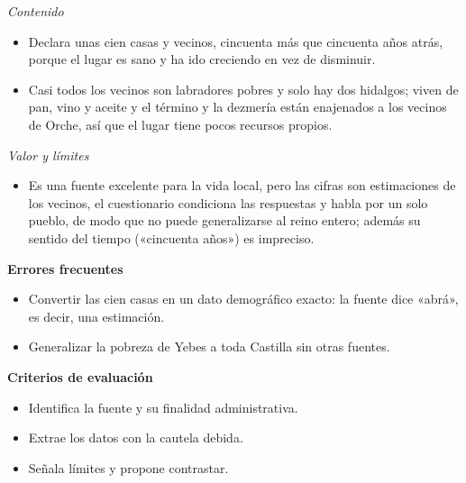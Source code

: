 \documentclass{book}
\begin{document}
\begin{tcolorbox}[title={Ejercicio resuelto}, studiumworked, breakable]
\noindent\textit{Contenido}
\begin{itemize}
\item Declara unas cien casas y vecinos, cincuenta más que cincuenta años atrás, porque el lugar es sano y ha ido creciendo en vez de disminuir.
\item Casi todos los vecinos son labradores pobres y solo hay dos hidalgos; viven de pan, vino y aceite y el término y la dezmería están enajenados a los vecinos de Orche, así que el lugar tiene pocos recursos propios.
\end{itemize}

\noindent\textit{Valor y límites}
\begin{itemize}
\item Es una fuente excelente para la vida local, pero las cifras son estimaciones de los vecinos, el cuestionario condiciona las respuestas y habla por un solo pueblo, de modo que no puede generalizarse al reino entero; además su sentido del tiempo («cincuenta años») es impreciso.
\end{itemize}

\noindent\textbf{Errores frecuentes}
\begin{itemize}
\item Convertir las cien casas en un dato demográfico exacto: la fuente dice «abrá», es decir, una estimación.
\item Generalizar la pobreza de Yebes a toda Castilla sin otras fuentes.
\end{itemize}

\noindent\textbf{Criterios de evaluación}
\begin{itemize}
\item Identifica la fuente y su finalidad administrativa.
\item Extrae los datos con la cautela debida.
\item Señala límites y propone contrastar.
\end{itemize}
\end{tcolorbox}
\end{document}
